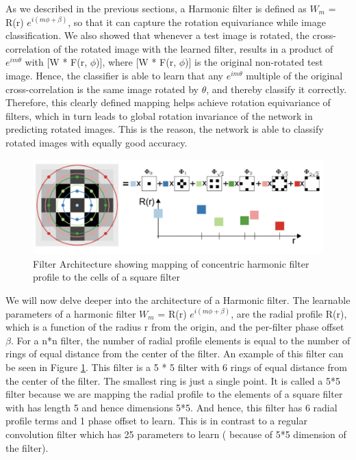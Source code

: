 \documentclass{article}
\begin{document}
As we described in the previous sections, a Harmonic filter is defined as $W_m$ = R(r) $e^{i(m \phi + \beta)}$, so that it can capture the rotation equivariance while image classification. We also showed that whenever a test image is rotated, the cross-correlation of the rotated image with the learned filter, results in a product of  $e^{i m \theta}$ with [W * F(r, $\phi$)], where [W * F(r, $\phi$)] is the original non-rotated test image. Hence, the classifier is able to learn that any $e^{i m \theta}$ multiple of the original cross-correlation is the same image rotated by $\theta$, and thereby classify it correctly. Therefore, this clearly defined mapping helps achieve rotation equivariance of filters, which in turn leads to global rotation invariance of the network in predicting rotated images. This is the reason, the network is able to classify rotated images with equally good accuracy.
\begin{figure}[t!]
  \includegraphics[width=\linewidth]{FilterArchitecture.png}
  \caption{Filter Architecture showing mapping of concentric harmonic filter profile to the cells of a square filter}
  \label{fig:FilterArch}
\end{figure}

We will now delve deeper into the architecture of a Harmonic filter.  The learnable parameters of a harmonic filter $W_m$ = R(r) $e^{i(m \phi + \beta)}$, are the radial profile R(r), which is a function of the radius r from the origin, and the per-filter phase offset $\beta$. For a n*n filter, the number of radial profile elements is equal to the number of rings of equal distance from the center of the filter. An example of this filter can be seen in Figure  \ref{fig:FilterArch}. This filter is a 5 * 5 filter with 6 rings of equal distance from the center of the filter. The smallest ring is just a single point. It is called a 5*5 filter because we are mapping the radial profile to the elements of a square filter with has length 5 and hence dimensions 5*5. And hence, this filter has 6 radial profile terms and 1 phase offset to learn. This is in contrast to a regular convolution filter which has 25 parameters to learn ( because of 5*5 dimension of the filter). 
\end{document}
